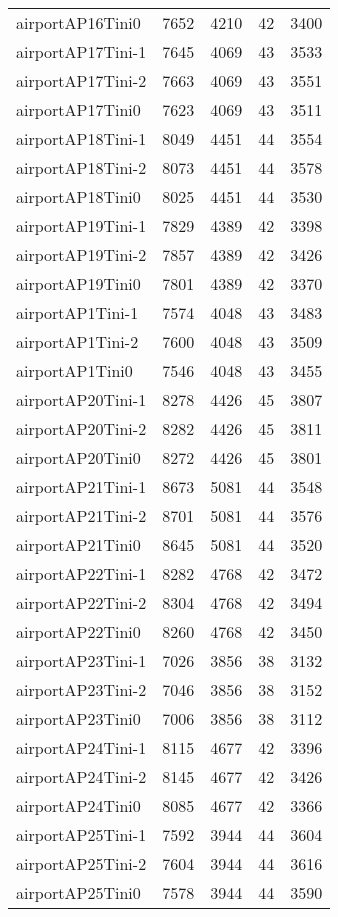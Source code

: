 \documentclass[../../../thesis.tex]{subfiles}
\begin{document}
\begin{longtable}{lrrrr}
airportAP16Tini0 & 7652 & 4210 & 42 & 3400 \\
airportAP17Tini-1 & 7645 & 4069 & 43 & 3533 \\
airportAP17Tini-2 & 7663 & 4069 & 43 & 3551 \\
airportAP17Tini0 & 7623 & 4069 & 43 & 3511 \\
airportAP18Tini-1 & 8049 & 4451 & 44 & 3554 \\
airportAP18Tini-2 & 8073 & 4451 & 44 & 3578 \\
airportAP18Tini0 & 8025 & 4451 & 44 & 3530 \\
airportAP19Tini-1 & 7829 & 4389 & 42 & 3398 \\
airportAP19Tini-2 & 7857 & 4389 & 42 & 3426 \\
airportAP19Tini0 & 7801 & 4389 & 42 & 3370 \\
airportAP1Tini-1 & 7574 & 4048 & 43 & 3483 \\
airportAP1Tini-2 & 7600 & 4048 & 43 & 3509 \\
airportAP1Tini0 & 7546 & 4048 & 43 & 3455 \\
airportAP20Tini-1 & 8278 & 4426 & 45 & 3807 \\
airportAP20Tini-2 & 8282 & 4426 & 45 & 3811 \\
airportAP20Tini0 & 8272 & 4426 & 45 & 3801 \\
airportAP21Tini-1 & 8673 & 5081 & 44 & 3548 \\
airportAP21Tini-2 & 8701 & 5081 & 44 & 3576 \\
airportAP21Tini0 & 8645 & 5081 & 44 & 3520 \\
airportAP22Tini-1 & 8282 & 4768 & 42 & 3472 \\
airportAP22Tini-2 & 8304 & 4768 & 42 & 3494 \\
airportAP22Tini0 & 8260 & 4768 & 42 & 3450 \\
airportAP23Tini-1 & 7026 & 3856 & 38 & 3132 \\
airportAP23Tini-2 & 7046 & 3856 & 38 & 3152 \\
airportAP23Tini0 & 7006 & 3856 & 38 & 3112 \\
airportAP24Tini-1 & 8115 & 4677 & 42 & 3396 \\
airportAP24Tini-2 & 8145 & 4677 & 42 & 3426 \\
airportAP24Tini0 & 8085 & 4677 & 42 & 3366 \\
airportAP25Tini-1 & 7592 & 3944 & 44 & 3604 \\
airportAP25Tini-2 & 7604 & 3944 & 44 & 3616 \\
airportAP25Tini0 & 7578 & 3944 & 44 & 3590 \\

\end{longtable}
\end{document}
